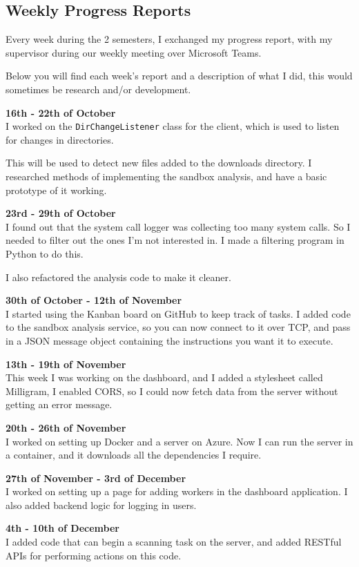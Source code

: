 \subsection{Weekly Progress Reports}
Every week during the 2 semesters, I exchanged my progress report,
with my supervisor during our weekly meeting over Microsoft Teams.

Below you will find each week's report and a description of what I did,
this would sometimes be research and/or development.

\textbf{16th - 22th of October} \\
I worked on the \texttt{DirChangeListener} class for the client,
which is used to listen for changes in directories.

This will be used to detect new files added to the downloads directory.
I researched methods of implementing the sandbox analysis,
and have a basic prototype of it working.

\textbf{23rd - 29th of October} \\
I found out that the system call logger was collecting too many system calls.
So I needed to filter out the ones I'm not interested in.
I made a filtering program in Python to do this.

I also refactored the analysis code to make it cleaner.

\textbf{30th of October - 12th of November} \\
I started using the Kanban board on GitHub to keep track of tasks.
I added code to the sandbox analysis service, so you can now connect to it over TCP,
and pass in a JSON message object containing the instructions you want it to execute.

\textbf{13th - 19th of November} \\
This week I was working on the dashboard, and I added a stylesheet called Milligram,
I enabled CORS, so I could now fetch data from the server without getting an error message.

\textbf{20th - 26th of November} \\
I worked on setting up Docker and a server on Azure.
Now I can run the server in a container, and it downloads all the dependencies I require.

\textbf{27th of November - 3rd of December} \\
I worked on setting up a page for adding workers in the dashboard application.
I also added backend logic for logging in users.

\textbf{4th - 10th of December} \\
I added code that can begin a scanning task on the server,
and added RESTful APIs for performing actions on this code.

